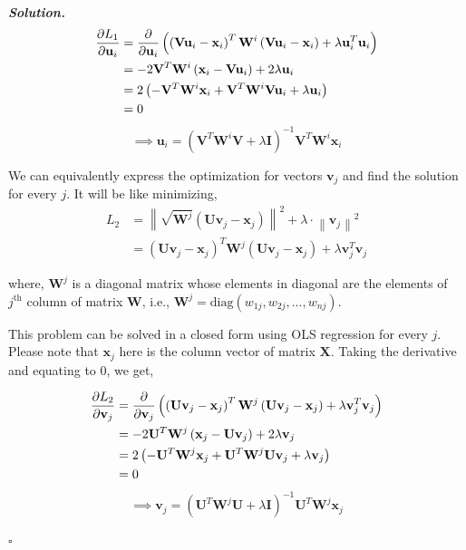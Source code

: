 \documentclass[10pt]{article}
\newenvironment{solution}[1][\it{Solution}]{\textbf{#1. } }{$\square$}
\begin{document}
\begin{solution}
\begin{align*}
	\pdv{L_1}{\mathbf{u}_i} &= \pdv{}{\mathbf{u}_i}\left(\left(\mathbf{V}\mathbf{u}_i-\mathbf{x}_i\right)^{T}\mathbf{W}^{i}\left(\mathbf{V}\mathbf{u}_i-\mathbf{x}_i\right) + \lambda\mathbf{u}_i^{T}\mathbf{u}_i\right)\\
	&= -2\mathbf{V}^{T}\mathbf{W}^{i}\left(\mathbf{x}_i-\mathbf{V}\mathbf{u}_i\right) + 2\lambda\mathbf{u}_i\\
	&= 2\left(-\mathbf{V}^{T}\mathbf{W}^{i}\mathbf{x}_i+\mathbf{V}^{T}\mathbf{W}^{i}\mathbf{V}\mathbf{u}_i+\lambda\mathbf{u}_i\right)\\
	&= 0\\
\end{align*}
$$
	\implies \boxed{\mathbf{u}_i = \left(\mathbf{V}^{T}\mathbf{W}^{i}\mathbf{V}+\lambda\mathbf{I}\right)^{-1}\mathbf{V}^{T}\mathbf{W}^{i}\mathbf{x}_i}
$$

We can equivalently express the optimization for vectors $\mathbf{v}_{j}$ and find the solution for every $j$. It will be like minimizing,
\begin{align*}
L_{2} &= \left\|\sqrt{\mathbf{W}^{j}}\left(\mathbf{U} \mathbf{v}_{j}-\mathbf{x}_{j}\right)\right\|^{2}+\lambda \cdot\left\|\mathbf{v}_{j}\right\|^{2}\\
      &= \left(\mathbf{U}\mathbf{v}_j-\mathbf{x}_j\right)^{T}\mathbf{W}^{j}\left(\mathbf{U}\mathbf{v}_j-\mathbf{x}_j\right) + \lambda\mathbf{v}_j^{T}\mathbf{v}_j
\end{align*}

where, $\mathbf{W}^{j}$ is a diagonal matrix whose elements in diagonal are the elements of $j^{\text{th}}$ column of matrix $\mathbf{W}$, i.e., $\mathbf{W}^{j} = \text{diag}\left(w_{1j}, w_{2j}, ..., w_{nj}\right)$.

This problem can be solved in a closed form using OLS regression for every $j$. Please note that $\mathbf{x}_j$ here is the column vector of matrix $\mathbf{X}$. Taking the derivative and equating to $0$, we get,

\begin{align*}
	\pdv{L_2}{\mathbf{v}_j} &= \pdv{}{\mathbf{v}_j}\left(\left(\mathbf{U}\mathbf{v}_j-\mathbf{x}_j\right)^{T}\mathbf{W}^{j}\left(\mathbf{U}\mathbf{v}_j-\mathbf{x}_j\right) + \lambda\mathbf{v}_j^{T}\mathbf{v}_j\right)\\
	&= -2\mathbf{U}^{T}\mathbf{W}^{j}\left(\mathbf{x}_j-\mathbf{U}\mathbf{v}_j\right) + 2\lambda\mathbf{v}_j\\
	&= 2\left(-\mathbf{U}^{T}\mathbf{W}^{j}\mathbf{x}_j+\mathbf{U}^{T}\mathbf{W}^{j}\mathbf{U}\mathbf{v}_j+\lambda\mathbf{v}_j\right)\\
	&= 0\\
\end{align*}
$$
	\implies \boxed{\mathbf{v}_j = \left(\mathbf{U}^{T}\mathbf{W}^{j}\mathbf{U}+\lambda\mathbf{I}\right)^{-1}\mathbf{U}^{T}\mathbf{W}^{j}\mathbf{x}_j}
$$


\end{solution}
\end{document}
